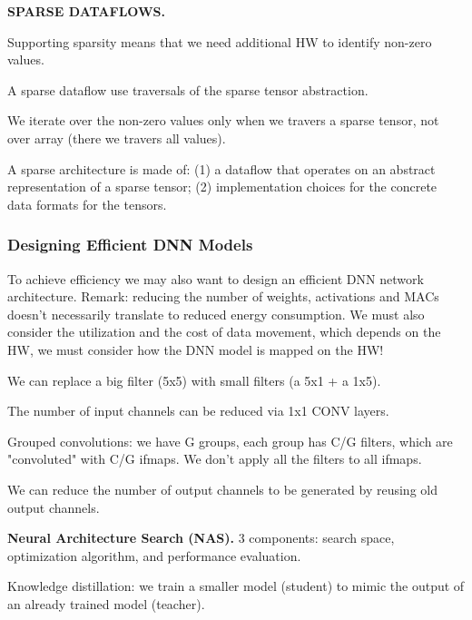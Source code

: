 \begin{dashlist}
    \item \textbf{SPARSE DATAFLOWS.}
    \begin{dashlist}
        \item Supporting sparsity means that we need additional HW to identify non-zero values.
        \item A sparse dataflow use traversals of the sparse tensor abstraction.
        \item We iterate over the non-zero values only when we travers a sparse tensor, not over array (there we travers all values).
        \item A sparse architecture is made of: (1) a dataflow that operates on an abstract representation of a sparse tensor; (2) implementation choices for the concrete data formats for the tensors.
    \end{dashlist}
\end{dashlist}

\subsubsection{Designing Efficient DNN Models}
To achieve efficiency we may also want to design an efficient DNN network architecture. Remark: reducing the number of weights, activations and MACs doesn't necessarily translate to reduced energy consumption. We must also consider the utilization and the cost of data movement, which depends on the HW, we must consider how the DNN model is mapped on the HW!

\begin{dashlist}
    \item We can replace a big filter (5x5) with small filters (a 5x1 + a 1x5).
    \item The number of input channels can be reduced via 1x1 CONV layers.
    \item Grouped convolutions: we have G groups, each group has C/G filters, which are "convoluted" with C/G ifmaps. We don't apply all the filters to all ifmaps.
    \item We can reduce the number of output channels to be generated by reusing old output channels.
    \item \textbf{Neural Architecture Search (NAS).} 3 components: search space, optimization algorithm, and performance evaluation. 
    \item Knowledge distillation: we train a smaller model (student) to mimic the output of an already trained model (teacher).
\end{dashlist}


